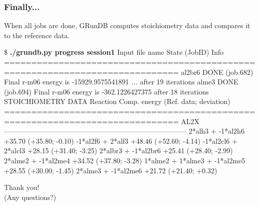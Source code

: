 \documentclass {beamer}
\newcommand{\largeskip}{\vspace{1em}}
\begin{document}
\begin{frame}[fragile]
  \frametitle{Finally...}

  When all jobs are done, GRunDB computes stoichiometry data and
  compares it to the reference data.

  \begin{scriptsize}
\begin{semiverbatim}
\$ {\bf ./grundb.py progress session1}
Input file name  State (JobID)       Info
==============================================================================
al2br6           DONE (job.682)      Final r-m06 energy is -15929.9575541891
  {\em ...}                                                     after 19 iterations 
alme3            DONE (job.694)      Final r-m06 energy is -362.1226427375
                                                           after 18 iterations 
STOICHIOMETRY DATA
Reaction                            Comp. energy  (Ref. data; deviation)
==============================================================================
                                     AL2X
------------------------------------------------------------------------------
2*alh3 + -1*al2h6                         +35.70  (+35.80; -0.10)
-1*al2f6 + 2*alf3                         +48.46  (+52.60; -4.14)
-1*al2cl6 + 2*alcl3                       +28.15  (+31.40; -3.25)
2*albr3 + -1*al2br6                       +25.41  (+28.40; -2.99)
2*alme2 + -1*al2me4                       +34.52  (+37.80; -3.28)
1*alme2 + 1*alme3 + -1*al2me5             +28.55  (+30.00; -1.45)
2*alme3 + -1*al2me6                       +21.72  (+21.40; +0.32)
\end{semiverbatim}    
  \end{scriptsize}
\end{frame}

\begin{frame}
  \begin{center}
    {\Huge Thank you!}
    \\
    \largeskip{} 
    {\Large (Any questions?)}
  \end{center}
\end{frame}
\end{document}
